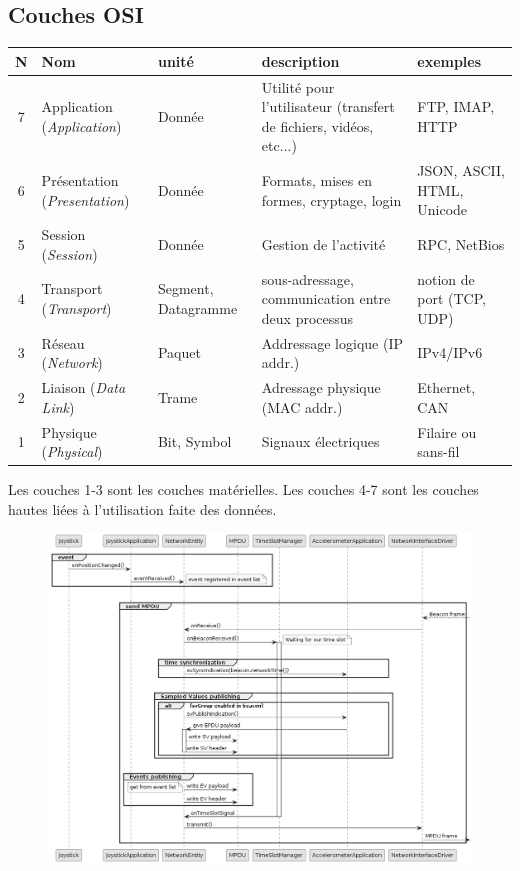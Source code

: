 \subsection{Couches OSI}
\begin{table}[H]
\centering
\begin{tabular}{cm{2.2cm}l m{5cm} m{5cm}}
N & Nom & unité & description & exemples\\\hline\hline
7 & Application (\emph{Application}) & Donnée & Utilité pour l'utilisateur (transfert de fichiers, vidéos, etc...) & FTP, IMAP, HTTP\\\hline
6 & Présentation (\emph{Presentation}) & Donnée & Formats, mises en formes, cryptage, login & JSON, ASCII, HTML, Unicode\\\hline
5 & Session (\emph{Session}) & Donnée & Gestion de l'activité & RPC, NetBios\\\hline
4 & Transport (\emph{Transport}) & Segment, Datagramme & sous-adressage, communication entre deux processus & notion de port (TCP, UDP)\\\hline
3 & Réseau (\emph{Network}) & Paquet & Addressage logique (IP addr.) & IPv4/IPv6\\\hline
2 & Liaison (\emph{Data Link}) & Trame & Adressage physique (MAC addr.) & Ethernet, CAN \\\hline
1 & Physique (\emph{Physical}) & Bit, Symbol & Signaux électriques & Filaire ou sans-fil
\end{tabular}
\end{table}
Les couches 1-3 sont les couches matérielles. Les couches 4-7 sont les couches hautes liées à l'utilisation faite des données.

\begin{figure}[H]
    \centering
    \includegraphics[width=0.9\linewidth]{figures/DeSEnet_sequence.png}
\end{figure}